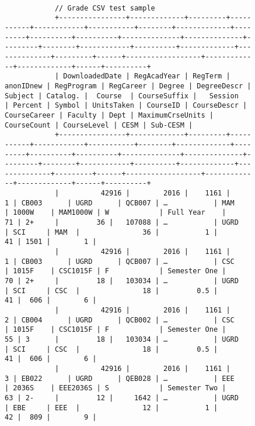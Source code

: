 \begin{figure}[H]
    \centering
    \begin{mdframed}[rightline=false,leftline=false]
        \centering
        \begin{BVerbatim}[fontsize=\tiny]

            // Grade CSV test sample
            +----------------+-------------+---------+-----------+------------+-----------+--------+-------------+---------+----------+----------+--------------+--------------+---------+--------+------------+----------+-------------+--------------+---------+------+------------------+-------------+-------------+------+----------+
            | DownloadedDate | RegAcadYear | RegTerm | anonIDnew | RegProgram | RegCareer | Degree | DegreeDescr | Subject | Catalog. |  Course  | CourseSuffix |   Session    | Percent | Symbol | UnitsTaken | CourseID | CourseDescr | CourseCareer | Faculty | Dept | MaximumCrseUnits | CourseCount | CourseLevel | CESM | Sub-CESM |
            +----------------+-------------+---------+-----------+------------+-----------+--------+-------------+---------+----------+----------+--------------+--------------+---------+--------+------------+----------+-------------+--------------+---------+------+------------------+-------------+-------------+------+----------+
            |          42916 |        2016 |    1161 |         1 | CB003      | UGRD      | QCB007 | …           | MAM     | 1000W    | MAM1000W | W            | Full Year    |      71 | 2+     |         36 |   107088 | …           | UGRD         | SCI     | MAM  |               36 |           1 |          41 | 1501 |        1 |
            |          42916 |        2016 |    1161 |         1 | CB003      | UGRD      | QCB007 | …           | CSC     | 1015F    | CSC1015F | F            | Semester One |      70 | 2+     |         18 |   103034 | …           | UGRD         | SCI     | CSC  |               18 |         0.5 |          41 |  606 |        6 |
            |          42916 |        2016 |    1161 |         2 | CB004      | UGRD      | QCB002 | …           | CSC     | 1015F    | CSC1015F | F            | Semester One |      55 | 3      |         18 |   103034 | …           | UGRD         | SCI     | CSC  |               18 |         0.5 |          41 |  606 |        6 |
            |          42916 |        2016 |    1161 |         3 | EB022      | UGRD      | QEB028 | …           | EEE     | 2036S    | EEE2036S | S            | Semester Two |      63 | 2-     |         12 |     1642 | …           | UGRD         | EBE     | EEE  |               12 |           1 |          42 |  809 |        9 |

\end{BVerbatim}
\end{mdframed}
\end{figure}
